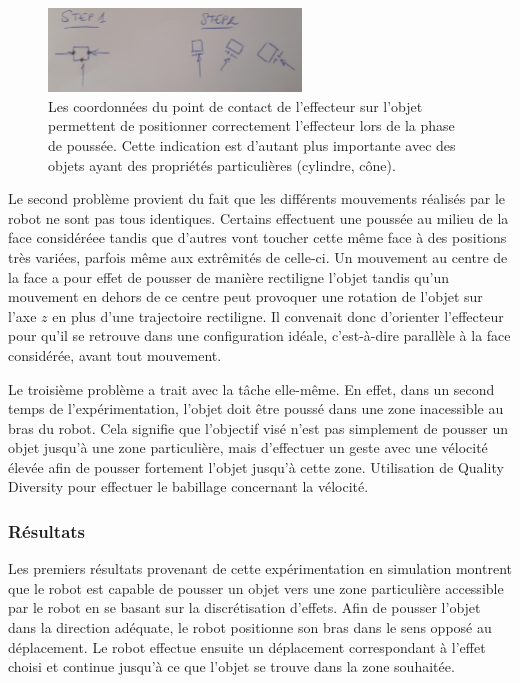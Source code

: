 \documentclass[draft]{llncs}
\begin{document}
\begin{figure}[ht]
  \begin{center}
  \includegraphics[width=0.6\textwidth]{figures/effector_problems.jpg}
    \caption{Les coordonnées du point de contact de l'effecteur sur l'objet permettent de positionner correctement l'effecteur lors de la phase de poussée. Cette indication est d'autant plus importante avec des objets ayant des propriétés particulières (cylindre, cône).}
  \label{fig:effector_problems}
  \end{center}
\end{figure}

Le second problème provient du fait que les différents mouvements réalisés par le robot ne sont pas tous identiques.
Certains effectuent une poussée au milieu de la face considéréee tandis que d'autres vont toucher cette même face à des positions très variées, parfois même aux extrêmités de celle-ci.
Un mouvement au centre de la face a pour effet de pousser de manière rectiligne l'objet tandis qu'un mouvement en dehors de ce centre peut provoquer une rotation de l'objet sur l'axe $z$ en plus d'une trajectoire rectiligne.
Il convenait donc d'orienter l'effecteur pour qu'il se retrouve dans une configuration idéale, c'est-à-dire parallèle à la face considérée, avant tout mouvement.

Le troisième problème a trait avec la tâche elle-même.
En effet, dans un second temps de l'expérimentation, l'objet doit être poussé dans une zone inacessible au bras du robot.
Cela signifie que l'objectif visé n'est pas simplement de pousser  un objet jusqu'à une zone particulière, mais d'effectuer un geste avec une vélocité élevée afin de pousser fortement l'objet jusqu'à cette zone.
Utilisation de Quality Diversity pour effectuer le babillage concernant la vélocité.

\subsubsection{Résultats}
Les premiers résultats provenant de cette expérimentation en simulation montrent que le robot est capable de pousser un objet vers une zone particulière accessible par le robot en se basant sur la discrétisation d'effets.
Afin de pousser l'objet dans la direction adéquate, le robot positionne son bras dans le sens opposé au déplacement.
Le robot effectue ensuite un déplacement correspondant à l'effet choisi et continue jusqu'à ce que l'objet se trouve dans la zone souhaitée.
\end{document}
